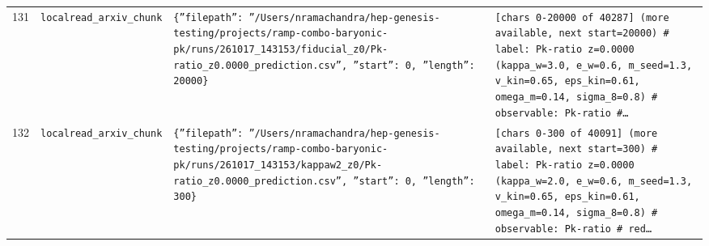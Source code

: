 \documentclass[11pt,a4paper]{article}
\begin{document}
\begin{longtable}{@{}p{}p{}p{}p{}@{}}
131 & \texttt{local}\newline\texttt{read\_\allowbreak{}arxiv\_\allowbreak{}chunk} & \texttt{\{''filepath'':\allowbreak{} ''/\allowbreak{}Users/\allowbreak{}nramachandra/\allowbreak{}hep-genesis-testing/\allowbreak{}projects/\allowbreak{}ramp-combo-baryonic-pk/\allowbreak{}runs/\allowbreak{}261017\_\allowbreak{}143153/\allowbreak{}fiducial\_\allowbreak{}z0/\allowbreak{}Pk-ratio\_\allowbreak{}z0.0000\_\allowbreak{}prediction.csv'',\allowbreak{} ''start'':\allowbreak{} 0,\allowbreak{} ''length'':\allowbreak{} 20000\}\allowbreak{}} & \texttt{[chars 0-20000 of 40287]\allowbreak{} (more available,\allowbreak{} next start=\allowbreak{}20000)\allowbreak{}  \# label:\allowbreak{} Pk-ratio z=\allowbreak{}0.0000 (kappa\_\allowbreak{}w=\allowbreak{}3.0,\allowbreak{} e\_\allowbreak{}w=\allowbreak{}0.6,\allowbreak{} m\_\allowbreak{}seed=\allowbreak{}1.3,\allowbreak{} v\_\allowbreak{}kin=\allowbreak{}0.65,\allowbreak{} eps\_\allowbreak{}kin=\allowbreak{}0.61,\allowbreak{} omega\_\allowbreak{}m=\allowbreak{}0.14,\allowbreak{} sigma\_\allowbreak{}8=\allowbreak{}0.8)\allowbreak{} \# observable:\allowbreak{} Pk-ratio \#\ldots{}\allowbreak{}} \\
132 & \texttt{local}\newline\texttt{read\_\allowbreak{}arxiv\_\allowbreak{}chunk} & \texttt{\{''filepath'':\allowbreak{} ''/\allowbreak{}Users/\allowbreak{}nramachandra/\allowbreak{}hep-genesis-testing/\allowbreak{}projects/\allowbreak{}ramp-combo-baryonic-pk/\allowbreak{}runs/\allowbreak{}261017\_\allowbreak{}143153/\allowbreak{}kappaw2\_\allowbreak{}z0/\allowbreak{}Pk-ratio\_\allowbreak{}z0.0000\_\allowbreak{}prediction.csv'',\allowbreak{} ''start'':\allowbreak{} 0,\allowbreak{} ''length'':\allowbreak{} 300\}\allowbreak{}} & \texttt{[chars 0-300 of 40091]\allowbreak{} (more available,\allowbreak{} next start=\allowbreak{}300)\allowbreak{}  \# label:\allowbreak{} Pk-ratio z=\allowbreak{}0.0000 (kappa\_\allowbreak{}w=\allowbreak{}2.0,\allowbreak{} e\_\allowbreak{}w=\allowbreak{}0.6,\allowbreak{} m\_\allowbreak{}seed=\allowbreak{}1.3,\allowbreak{} v\_\allowbreak{}kin=\allowbreak{}0.65,\allowbreak{} eps\_\allowbreak{}kin=\allowbreak{}0.61,\allowbreak{} omega\_\allowbreak{}m=\allowbreak{}0.14,\allowbreak{} sigma\_\allowbreak{}8=\allowbreak{}0.8)\allowbreak{} \# observable:\allowbreak{} Pk-ratio \# red\ldots{}\allowbreak{}} \\

\end{longtable}
\end{document}
